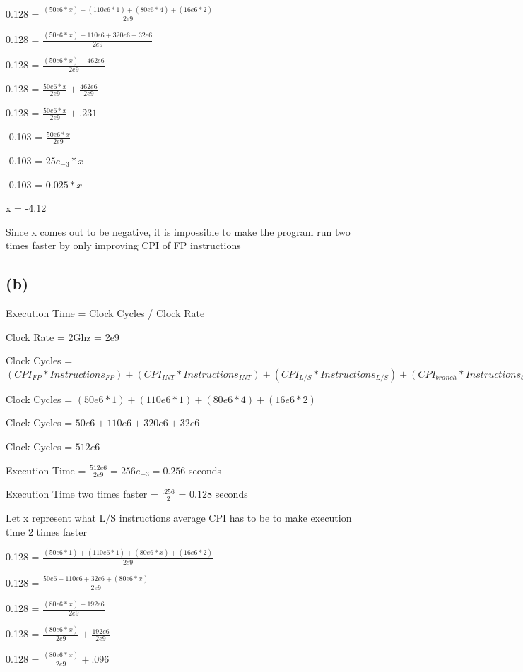 \documentclass{article}
\begin{document}
    0.128 = $\frac{(50e6 * x) + (110e6 * 1) + (80e6 * 4) + (16e6 * 2)}{2e9}$

    0.128 = $\frac{(50e6 * x) + 110e6 + 320e6 + 32e6}{2e9}$

    0.128 = $\frac{(50e6 * x) + 462e6}{2e9}$

    0.128 = $\frac{50e6*x}{2e9} + \frac{462e6}{2e9}$

    0.128 = $\frac{50e6*x}{2e9} + .231$

    -0.103 = $\frac{50e6*x}{2e9}$

    -0.103 = $25e_{-3} * x$

    -0.103 = $0.025 * x$

    x = -4.12

    Since x comes out to be negative, it is impossible to make the program run two times faster by only improving CPI of FP instructions

    \subsection*{(b)}

    Execution Time = Clock Cycles / Clock Rate

    Clock Rate = 2Ghz = 2e9

    Clock Cycles = $(CPI_{FP} * Instructions_{FP}) + (CPI_{INT} * Instructions_{INT}) + (CPI_{L/S} * Instructions_{L/S}) + (CPI_{branch}* Instructions_{branch})$

    Clock Cycles = $(50e6 * 1) + (110e6 * 1) + (80e6 * 4) + (16e6 * 2)$

    Clock Cycles = $50e6 + 110e6 + 320e6 + 32e6$

    Clock Cycles = $512e6$

    Execution Time = $\frac{512e6}{2e9} = 256e_{-3} = 0.256$ seconds

    Execution Time two times faster = $\frac{.256}{2}$ = 0.128 seconds

    Let x represent what L/S instructions average CPI has to be to make execution time 2 times faster

    0.128 = $\frac{(50e6 * 1) + (110e6 * 1) + (80e6 * x) + (16e6 * 2)}{2e9}$

    0.128 = $\frac{50e6 + 110e6 + 32e6 + (80e6 * x)}{2e9}$

    0.128 = $\frac{(80e6 * x) + 192e6}{2e9}$

    0.128 = $\frac{(80e6 * x)}{2e9} + \frac{192e6}{2e9}$

    0.128 = $\frac{(80e6 * x)}{2e9} + .096$
\end{document}
